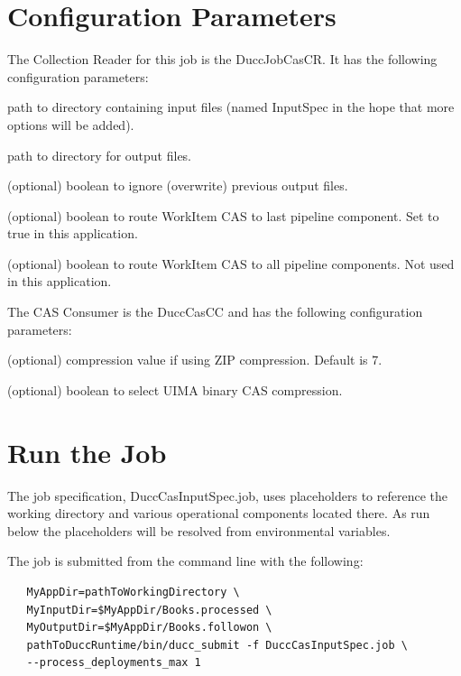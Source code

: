 \section{Configuration Parameters}
The Collection Reader for this job is the DuccJobCasCR. It has the following configuration
parameters:

\begin{description}[labelindent=0.5in,leftmargin=0.5in]
    \item[InputSpec] path to directory containing input files (named InputSpec in the hope that more options will be added).
    \item[OutputDirectory] path to directory for output files.
    \item[IgnorePreviousOutput] (optional) boolean to ignore (overwrite) previous output files.
    \item[SendToLast] (optional) boolean to route WorkItem CAS to last pipeline component. Set to true in this application.
    \item[SendToAll] (optional) boolean to route WorkItem CAS to all pipeline components. Not used in this application.
\end{description}


The CAS Consumer is the DuccCasCC and has the following configuration parameters:

\begin{description}[labelindent=0.5in,leftmargin=0.5in]
  \item[XmiCompressionLevel] (optional) compression value if using ZIP compression. Default is 7.
  \item[UseBinaryCompression] (optional) boolean to select UIMA binary CAS compression.
\end{description}

\section{Run the Job}
The job specification, DuccCasInputSpec.job, uses placeholders to reference the working directory
and various operational components located there. As run below the placeholders will be resolved
from environmental variables. 

The job is submitted from the command line with the following:
\begin{verbatim}
   MyAppDir=pathToWorkingDirectory \
   MyInputDir=$MyAppDir/Books.processed \ 
   MyOutputDir=$MyAppDir/Books.followon \
   pathToDuccRuntime/bin/ducc_submit -f DuccCasInputSpec.job \
   --process_deployments_max 1
\end{verbatim}

